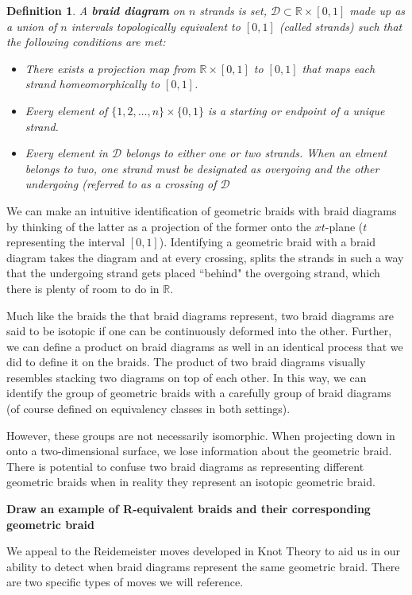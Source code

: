 \documentclass[10pt]{ucthesis}
\newcommand{\R}{\mathbb{R}}
\newtheorem{definition}{Definition}[chapter]
\begin{document}
\begin{definition}
	A \textbf{braid diagram} on $n$ strands is set, $\mathcal{D}\subset \R\times [0,1]$ made up as a union of $n$ intervals topologically equivalent to $[0,1]$ (called strands) such that the following conditions are met:
\begin{itemize}
	\item There exists a projection map from $\R\times [0,1]$ to $[0,1]$ that maps each strand homeomorphically to $[0,1]$.
	\item Every element of $\{1,2,\hdots,n\}\times\{0,1\}$ is a starting or endpoint of a unique strand.
	\item Every element in $\mathcal{D}$ belongs to either one or two strands. When an elment belongs to two, one strand must be designated as overgoing and the other undergoing (referred to as a crossing of $\mathcal{D}$
\end{itemize}
\end{definition}

We can make an intuitive identification of geometric braids with braid diagrams by thinking of the latter as a projection of the former onto the $xt$-plane ($t$ representing the interval $[0,1]$). Identifying a geometric braid with a braid diagram takes the diagram and at every crossing, splits the strands in such a way that the undergoing strand gets placed ``behind" the overgoing strand, which there is plenty of room to do in $\R$.

Much like the braids the that braid diagrams represent, two braid diagrams are said to be isotopic if one can be continuously deformed into the other. Further, we can define a product on braid diagrams as well in an identical process that we did to define it on the braids. The product of two braid diagrams visually resembles stacking two diagrams on top of each other. In this way, we can  identify the group of geometric braids with a carefully group of braid diagrams (of course defined on equivalency classes in both settings). 

However, these groups are not necessarily isomorphic. When projecting down in onto a two-dimensional surface, we lose information about the geometric braid. There is potential to confuse two braid diagrams as representing different geometric braids when in reality they represent an isotopic geometric braid.

\textbf{Draw an example of R-equivalent braids and their corresponding geometric braid}

We appeal to the Reidemeister moves developed in Knot Theory to aid us in our ability to detect when braid diagrams represent the same geometric braid. There are two specific types of moves we will reference.
\end{document}
